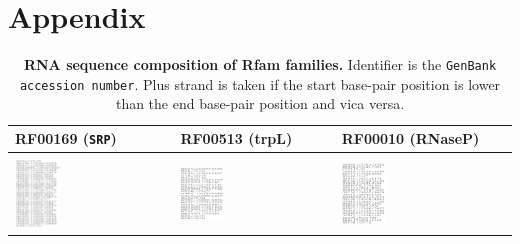 \documentclass[ twoside,openright,titlepage,numbers=noenddot,headinclude,%
                footinclude=false, cleardoublepage=empty,abstractoff, %
                BCOR=5mm,paper=a4,fontsize=11pt,%
                ngerman,american,%
                ]{scrreprt}
\begin{document}
\chapter{Appendix}

\begin{table}
\centering
\begin{tabular}{l|l|l|l}
RF00169 (\texttt{SRP}) & RF00513 (trpL) & RF00010 (RNaseP)\\
\hline \\[1pt]

\includegraphics[width=0.3\textwidth]{./pictures/SRPSequences.png} & 
\includegraphics[width=0.3\textwidth]{./pictures/TRPSequences.png} & 
\includegraphics[width=0.3\textwidth]{./pictures/RNAsePSequences.png}\\
\end{tabular}
\caption{{\bf RNA sequence composition of Rfam families.}
Identifier is the \texttt{GenBank accession number}. Plus strand is taken if the start base-pair position is lower than the end base-pair position and vica versa.}
\label{table:alignment composition}
\end{table}
\end{document}
